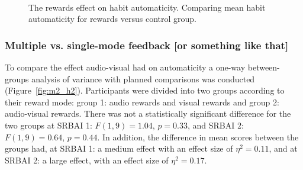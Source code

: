 \documentclass{scaffold/sigchi}
\begin{document}
\begin{figure}
  \centering
  \caption{The rewards effect on habit automaticity. Comparing mean habit automaticity for rewards versus control group.}~\label{fig:m2_h1}
\end{figure}

\subsubsection{Multiple vs. single-mode feedback [or something like that]}
To compare the effect audio-visual had on automaticity a one-way between-groups analysis of variance with planned comparisons was conducted (Figure~\ref{fig:m2_h2}). Participants were divided into two groups according to their reward mode: group 1: audio rewards and visual rewards and group 2: audio-visual rewards. There was not a
statistically significant difference for the two groups at SRBAI 1: $ F(1,9) = 1.04$, $p = 0.33$, and SRBAI 2: $F(1,9) = 0.64$, $p = 0.44$. In addition, the difference in mean scores between the groups had, at SRBAI 1: a medium effect with an effect size of $\eta^{2} = 0.11$, and at SRBAI 2: a large effect, with an effect size of $\eta^{2} = 0.17$.
\end{document}
